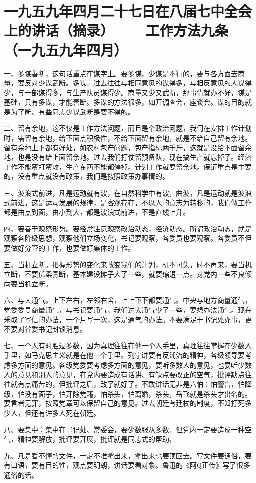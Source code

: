 \section[一九五九年四月二十七日在八届七中全会上的讲话（摘录）——工作方法九条（一九五九年四月）]{一九五九年四月二十七日在八届七中全会上的讲话（摘录）——工作方法九条（一九五九年四月）}


一、多谋善断，这句话重点在谋字上。要多谋，少谋是不行的，要与各方面去商量，要反对少谋武断。多谋，过去往往与相同意见的谋得多，与相反意见的人谋得少，与干部谋得多，与生产队员谋得少。商量又少又武断，那事情就办不好，谋是基础，只有多谋，才能善断。多谋的方法很多，如开调查会，座谈会。谋的目的就是为了断。有些同志少谋武断是要不得的。

二、留有余地，这不仅是工作方法问题，而且是个政治问题，我们在安排工作计划时，需留有余地，给下面点积极性，不给下面留有余地，就是不给自己留有余地。留有余地上下都有好处，如农村包产问题，包产指标两千斤，这就是没给下面留余地，也是没有给上面留余地。过去我们打仗留预备队，现在搞生产就忘掉了。经济工作不能蛮打蛮攻，生产东西不能都停掉。计划工作就要留余地。保证重点是主要的，没有重点就没有政策，我们是按照政策办事情的。

三、波浪式前进，凡是运动就有波，在自然科学中有波，曲波，凡是运动就是波浪式前进，这是运动发展的规律，是客观存在，不以人的意志为转移的，我们做工作都是由点到面，由小到大，都是波浪式前进，不是直线上升。

四、要善于观察形势。要经常注意观察政治动态，经济动态。所谓政治动态，就是观察各阶级思想，观察他们立场变化，书记要观察，各委员也要观察。各委员不但要做好分管的工作，也要做好集体的工作。

五、当机立断。把握形势的变化来改变我们的计划，机不可失，时不再来，要当机立断，不要优柔寡断，基本建设摊子大了一些，就要缩短一点。对党内一些不良倾向要当机立断。

六、与人通气。上下左右，左邻右舍，上上下下都要通气。中央与地方商量通气，党委委员商量通气，与书记要通气，我们过去通气少了一些，要想办法通气。现在釆取了写信的办法，一个月写一次，这是通气的办法。不要满足于书记处办事，更不要对省委书记封锁消息。

七、一个人有时胜过多数，因为真理往往在他一个人手里，真理往往掌握在少数人手里，如马克思主义就是在他一个手里。列宁讲要有反潮流的精神，各级领导要考虑多方面的意见。各级党委要考虑多方面的意见，要听多数人的意见，也要听少数人的意见和别人的意见，在党内要造成有话讲、有缺点要改正的空气，批评缺点往往就有点痛苦的，但批评之后，改了就好了。不敢讲话无非是六怕：怕警告，怕降级，怕没有面子，怕开除党籍，怕杀头，怕离婚，杀头，岳飞就是杀头才出名的。要言者无罪，按照党章可以保留自己的意见。过去朝廷有廷杖的制度，不知打死多少人，但还有许多人死在朝廷。

八、要集中：集中在书记处、常委会，要少数服从多数，但党内一定要造成一种空气，精神要解放，批评要开展，批评就是同志式的帮助。

九、凡是看不懂的文件，一定不准拿出来，拿出来也要顶回去。写文件要通俗，要有口语，要有目的性，观点要明朗，讲话要看对象。鲁迅的《阿Q正传》写了很多通俗的话。


